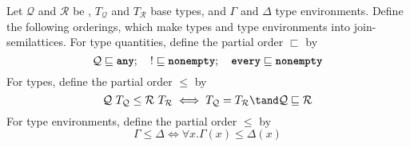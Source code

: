\documentclass[10pt]{article}
\begin{document}
\begin{definition}
    Let $\mathcal{Q}$ and $\mathcal{R}$ be \typeQuantities, $T_\mathcal{Q}$ and $T_\mathcal{R}$ base types, and $\Gamma$ and $\Delta$ type environments.
    Define the following orderings, which make types and type environments into join-semilattices.
    For type quantities, define the partial order $\sqsubset$ by
    \[
        \mathcal{Q} \sqsubseteq \textbf{\texttt{any}}; \quad ! \sqsubseteq \textbf{\texttt{nonempty}}; \quad \textbf{\texttt{every}} \sqsubseteq \textbf{\texttt{nonempty}}
    \]
    For types, define the partial order $\leq$ by
    \[
        \mathcal{Q}~T_\mathcal{Q} \leq \mathcal{R}~T_\mathcal{R} \iff T_\mathcal{Q} = T_\mathcal{R} \tand \mathcal{Q} \sqsubseteq \mathcal{R}
    \]
    For type environments, define the partial order $\leq$ by
    \[
        \Gamma \leq \Delta \iff \forall x. \Gamma(x) \leq \Delta(x)
    \]
\end{definition}
\end{document}
